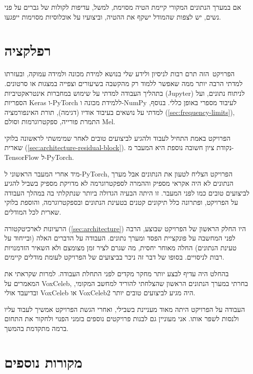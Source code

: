 \documentclass[hebrew, a4paper]{article}
\theoremstyle{plain}
\theoremstyle{definition}
\numberwithin{equation}{section}
\begin{document}
אם במערך הנתונים המקורי קיימת הטיה מסוימת, למשל, עדיפות לקולות של
גברים על פני נשים, יש לצפות שהמודל ישקף את ההטיה, וביצועיו על
אוכלוסיות מסוימות ייפגעו.

\section{רפלקציה}
\label{sec:reflection}

הפרויקט~הזה תרם רבות לניסיון ולידע שלי בנושא למידת מכונה ולמידה עמוקה,
ובעזרתו למדתי הרבה יותר ממה שאפשר ללמוד רק מהקשבה בשיעורים וצפייה
במצגות או סרטונים. בתהליך העבודה למדתי על שימוש במחברות אינטראקטיביות
(Jupyter) לניתוח נתונים, ועל הספריות Keras ו-PyTorch ללמידת מכונה
ו-NumPy לעיבוד מספרי באופן כללי. בנוסף, למדתי על נושאים בעיבוד אודיו
(דגימה), תורת האינפורמציה (\autoref{sec:frequency-limits}), התמרת
פורייה, ספקטרוגרמות וסולם Mel.

הפרויקט באמת התחיל לעבוד ולהגיע לביצועים טובים לאחר שמימשתי לראשונה
בלוקי שארית (\autoref{sec:architecture-residual-block}). נקודת ציון
חשובה נוספת היא המעבר מ-TensorFlow ל-PyTorch.

מיד אחרי המעבר הראשוני ל-PyTorch, הפרויקט הצליח לטעון את הנתונים אבל
מערך הנתונים לא היה אקראי מספיק וההמרה לספקטרוגרמה לא מדויקת מספיק
בשביל להגיע לביצועים טובים כמו לפני המעבר. זו היתה הבעיה הגדולה ביותר
שנתקלתי בה במהלך העבודה על הפרויקט, ופתרונה כלל תיקונים קטנים בטעינת
הנתונים ובספקטרוגרמה, והוספת בלוקי שארית לכל המודלים.

הרעיונות לארכיטקטורה (\autoref{sec:architecture}) היו החלק הראשון של
הפרויקט שבוצע, הרבה לפני המחשבה על פונקציית הפסד ומערך נתונים. העבודה
על הדברים האלה (ובייחוד על טעינת הנתונים) החלה מאוחר יחסית, מה שגרם
לציר זמן מצומצם ולא השאיר הזדמנויות רבות לניסויים. בסופו של דבר זה
ניכר בביצועים של הפרויקט לעומת מודלים קיימים.

בהחלט היה עדיף לבצע יותר מחקר מקדים לפני התחלת העבודה. למרות שקראתי את
המאמרים על VoxCeleb, בחרתי במערך הנתונים הראשון שהצלחתי להוריד למחשב
המקומי, ובדיעבד אולי VoxCeleb או VoxCeleb2 היה מגיע לביצועים טובים
יותר.

העבודה על הפרויקט היתה מאוד מעניינת בשבילי, ואחרי הגשת הפרויקט אמשיך
לעבוד עליו ולנסות לשפר אותו. אני מעוניין גם לבנות פרויקטים נוספים
בזמני הפנוי ולחקור את התחום ברמה מתקדמת בהמשך.

\begin{otherlanguage}{english}
  \printbibliography[heading=bibintoc,title={\texthebrew{ביבליוגרפיה}}]
\end{otherlanguage}

\section*{מקורות נוספים}
\end{document}
